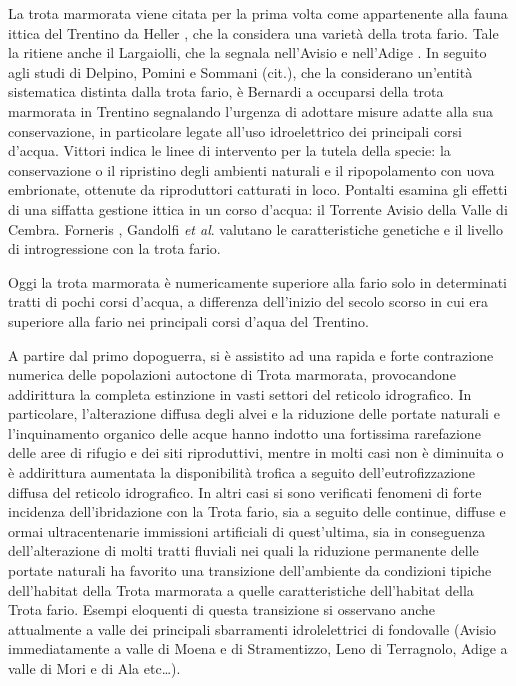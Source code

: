 \documentclass[10pt,twoside,openany,x11names,svgnames,italian,a5paper,dvipsnames,table]{memoir}
\newcommand{\etal}{\textsl{et al}. }
\begin{document}
La trota marmorata viene citata per la prima volta come appartenente alla fauna ittica del Trentino da Heller \cite{Heller}, che la considera una varietà della trota fario. Tale la ritiene anche il Largaiolli, che la segnala nell’Avisio \cite{Largaiolli02} e nell’Adige \cite{Largaiolli34}. In seguito agli studi di Delpino, Pomini e Sommani (cit.), che la considerano un'entità sistematica distinta dalla trota fario, è Bernardi \cite{Bernardi51} \cite{Bernardi56} a occuparsi della trota marmorata in Trentino segnalando l'urgenza di adottare misure adatte alla sua conservazione, in particolare legate all'uso idroelettrico dei principali corsi d'acqua.
Vittori \cite{Vittori66} \cite{Vittori81} indica le linee di intervento per la tutela della specie: la conservazione o il ripristino degli ambienti naturali e il ripopolamento con uova embrionate, ottenute da riproduttori catturati in loco. Pontalti \cite{Pontalti89} esamina gli effetti di una siffatta gestione ittica in un corso d’acqua: il Torrente Avisio della Valle di Cembra. Forneris \cite{Forneris}, Gandolfi \etal \cite{Gandolfi10a} valutano le caratteristiche genetiche e il livello di introgressione con la trota fario. 

Oggi la trota marmorata è numericamente superiore alla fario solo in determinati tratti di pochi corsi d'acqua, a differenza dell'inizio del secolo scorso in cui era superiore alla fario nei principali corsi d'aqua del Trentino.

A partire dal primo dopoguerra, si è assistito ad una rapida e forte contrazione numerica delle popolazioni autoctone di Trota marmorata, provocandone addirittura la completa estinzione in vasti settori del reticolo idrografico. In particolare, l’alterazione diffusa degli alvei e la riduzione delle portate naturali e l’inquinamento organico delle acque hanno indotto una fortissima rarefazione delle aree di rifugio e dei siti riproduttivi, mentre in molti casi non è diminuita o è addirittura aumentata la disponibilità trofica a seguito dell’eutrofizzazione diffusa del reticolo idrografico.
In altri casi si sono verificati fenomeni di forte incidenza dell’ibridazione con la Trota fario, sia a seguito delle continue, diffuse e ormai ultracentenarie immissioni artificiali di quest’ultima, sia in conseguenza dell’alterazione di molti tratti fluviali nei quali la riduzione permanente delle portate naturali ha favorito una transizione dell’ambiente da condizioni tipiche dell’habitat della Trota marmorata a quelle caratteristiche dell’habitat della Trota fario. Esempi eloquenti di questa transizione si osservano anche attualmente a valle dei principali sbarramenti idrolelettrici di fondovalle (Avisio immediatamente a valle di Moena e di Stramentizzo, Leno di Terragnolo, Adige a valle di Mori e di Ala etc\dots).
\end{document}
